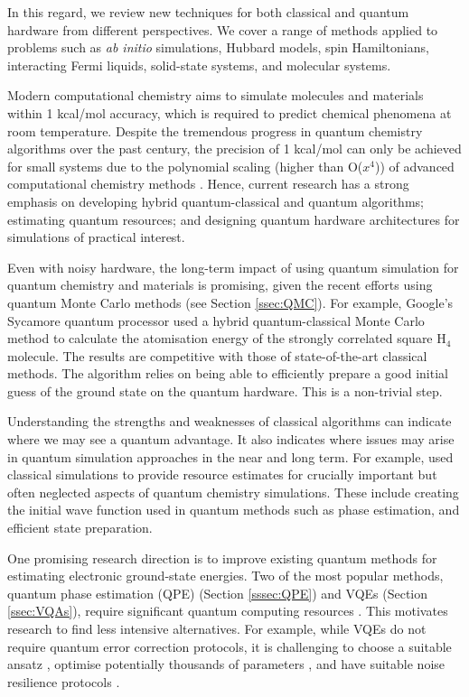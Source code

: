 \documentclass[10pt]{iopart}
\begin{document}
In this regard, we review new techniques for both classical and quantum hardware from different perspectives. We cover a range of methods applied to problems such as \textit{ab initio} simulations, Hubbard models, spin Hamiltonians, interacting Fermi liquids, solid-state systems, and molecular systems. 

Modern computational chemistry aims to simulate molecules and materials within 1 kcal/mol accuracy, which is required to predict chemical phenomena at room temperature. Despite the tremendous progress in quantum chemistry algorithms over the past century, the precision of 1 kcal/mol can only be achieved for small systems due to the polynomial scaling (higher than O($x^{4}$)) of advanced computational chemistry methods \cite{Grimme2018}. Hence, current research has a strong emphasis on developing hybrid quantum-classical and quantum algorithms; estimating quantum resources; and designing quantum hardware architectures for simulations of practical interest. 

Even with noisy hardware, the long-term impact of using quantum simulation for quantum chemistry and materials is promising, given the recent efforts using quantum Monte Carlo methods (see Section \ref{ssec:QMC}). For example, Google's Sycamore quantum processor used a hybrid quantum-classical Monte Carlo method \cite{Arute2019} to calculate the atomisation energy of the strongly correlated square H$_{\text{4}}$ molecule. The results are competitive with those of state-of-the-art classical methods. The algorithm relies on being able to efficiently prepare a good initial guess of the ground state on the quantum hardware.  This is a non-trivial step.

Understanding the strengths and weaknesses of classical algorithms can indicate where we may see a quantum advantage. It also indicates where issues may arise in quantum simulation approaches in the near and long term. For example, \citeauthor{Tubman2018} \cite{Tubman2018} used classical simulations to provide resource estimates for crucially important but often neglected aspects of quantum chemistry simulations. These include creating the initial wave function used in quantum methods such as phase estimation, and efficient state preparation. 

One promising research direction is to improve existing quantum methods for estimating electronic ground-state energies. Two of the most popular methods, quantum phase estimation (QPE) \cite{AspuruGuzik2005} (Section \ref{sssec:QPE}) and VQEs \cite{Kandala2017} (Section \ref{ssec:VQAs}), require significant quantum computing resources \cite{Gonthier2022}. This motivates research to find less intensive alternatives. For example, while VQEs do not require quantum error correction protocols, it is challenging to choose a suitable ansatz \cite{Tang2021a}, optimise potentially thousands of parameters \cite{McClean2018}, and have suitable noise resilience protocols \cite{Fontana2021,Wang2021n}.
\end{document}
